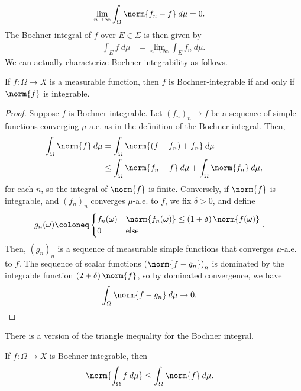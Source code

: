 \documentclass[10pt]{mypackage}
\begin{document}
\begin{align*}
  \lim_{n\rightarrow\infty}\int_{\Omega}^{} \norm{f_n-f}\:d\mu &= 0.
\end{align*}
The Bochner integral of $f$ over $E\in \Sigma$ is then given by
\begin{align*}
  \int_{E}^{} f\:d\mu &= \lim_{n\rightarrow\infty} \int_{E}^{} f_n\:d\mu.
\end{align*}
We can actually characterize Bochner integrability as follows.
\begin{theorem}
  If $f\colon \Omega\rightarrow X$ is a measurable function, then $f$ is Bochner-integrable if and only if $\norm{f}$ is integrable.
\end{theorem}
\begin{proof}
  Suppose $f$ is Bochner integrable. Let $\left( f_n \right)_n\rightarrow f$ be a sequence of simple functions converging $\mu$-a.e. as in the definition of the Bochner integral. Then,
  \begin{align*}
    \int_{\Omega}^{} \norm{f}\:d\mu &= \int_{\Omega}^{} \norm{\left( f-f_n \right) + f_n}\:d\mu\\
                                    &\leq \int_{\Omega}^{} \norm{f_n-f}\:d\mu + \int_{\Omega}^{} \norm{f_n}\:d\mu,
  \end{align*}
  for each $n$, so the integral of $\norm{f}$ is finite. Conversely, if $\norm{f}$ is integrable, and $\left( f_n \right)_n$ converges $\mu$-a.e. to $f$, we fix $\delta > 0$, and define
  \begin{align*}
    g_n(\omega) &\coloneq \begin{cases}
      f_n(\omega) & \norm{f_n(\omega)} \leq \left( 1+\delta \right)\norm{f(\omega)}\\
      0 & \text{else}
    \end{cases}.
  \end{align*}
  Then, $\left( g_n \right)_n$ is a sequence of measurable simple functions that converges $\mu$-a.e. to $f$. The sequence of scalar functions $\left( \norm{f-g_n} \right)_n$ is dominated by the integrable function $\left( 2+\delta \right)\norm{f}$, so by dominated convergence, we have
  \begin{align*}
    \int_{\Omega}^{} \norm{f-g_n}\:d\mu &\rightarrow 0.
  \end{align*}
\end{proof}
There is a version of the triangle inequality for the Bochner integral.
\begin{corollary}
  If $f\colon \Omega\rightarrow X$ is Bochner-integrable, then
  \begin{align*}
    \norm{ \int_{\Omega}^{} f\:d\mu } &\leq \int_{\Omega}^{} \norm{f}\:d\mu.
  \end{align*}
\end{corollary}
\end{document}
